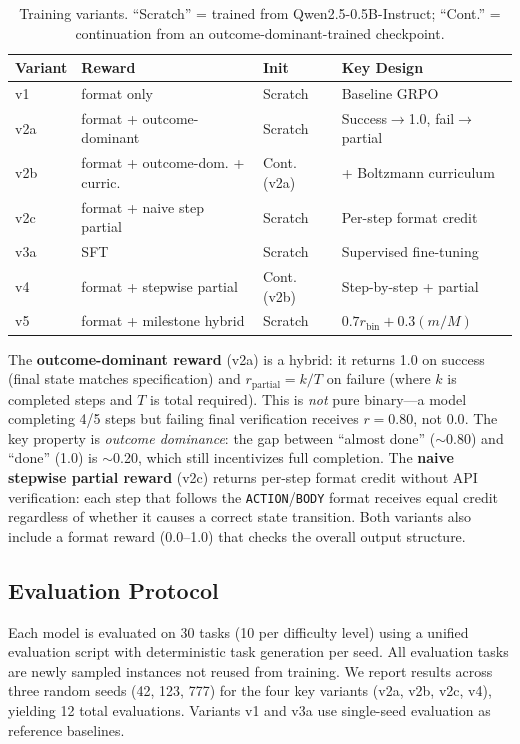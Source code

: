 \documentclass[11pt]{article}
\begin{document}
\begin{table}[t]
\centering
\caption{Training variants. ``Scratch'' = trained from Qwen2.5-0.5B-Instruct; ``Cont.'' = continuation from an outcome-dominant-trained checkpoint.}
\label{tab:variants}
\small
\begin{tabular}{@{}llll@{}}
\toprule
\textbf{Variant} & \textbf{Reward} & \textbf{Init} & \textbf{Key Design} \\
\midrule
v1   & format only          & Scratch & Baseline GRPO \\
v2a  & format + outcome-dominant & Scratch & Success$\to$1.0, fail$\to$partial \\
v2b  & format + outcome-dom. + curric. & Cont. (v2a) & + Boltzmann curriculum \\
v2c  & format + naive step partial & Scratch & Per-step format credit \\
v3a  & SFT                  & Scratch & Supervised fine-tuning \\
v4   & format + stepwise partial & Cont. (v2b) & Step-by-step + partial \\
v5   & format + milestone hybrid & Scratch & $0.7 r_{\text{bin}} + 0.3 (m/M)$ \\
\bottomrule
\end{tabular}
\end{table}

The \textbf{outcome-dominant reward} (v2a) is a hybrid: it returns 1.0 on success (final state matches specification) and $r_{\text{partial}} = k/T$ on failure (where $k$ is completed steps and $T$ is total required).
This is \emph{not} pure binary---a model completing 4/5 steps but failing final verification receives $r = 0.80$, not $0.0$.
The key property is \emph{outcome dominance}: the gap between ``almost done'' ($\sim$0.80) and ``done'' (1.0) is $\sim$0.20, which still incentivizes full completion.
The \textbf{naive stepwise partial reward} (v2c) returns per-step format credit without API verification: each step that follows the \texttt{ACTION}/\texttt{BODY} format receives equal credit regardless of whether it causes a correct state transition.
Both variants also include a format reward (0.0--1.0) that checks the overall output structure.

\subsection{Evaluation Protocol}

Each model is evaluated on 30 tasks (10 per difficulty level) using a unified evaluation script with deterministic task generation per seed.
All evaluation tasks are newly sampled instances not reused from training.
We report results across three random seeds (42, 123, 777) for the four key variants (v2a, v2b, v2c, v4), yielding 12 total evaluations.
Variants v1 and v3a use single-seed evaluation as reference baselines.
\end{document}
